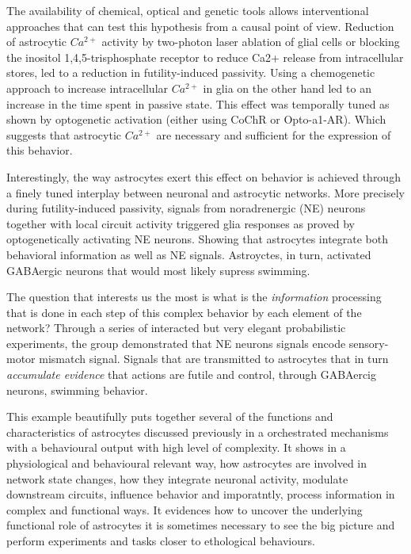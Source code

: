 The availability of chemical, optical and genetic tools allows interventional approaches that can test this hypothesis from a causal point of view. 
Reduction of astrocytic $Ca^{2+}$ activity by two-photon laser ablation of glial cells or blocking the inositol 1,4,5-trisphosphate receptor to reduce Ca2+ release from intracellular stores, led to a reduction in  futility-induced passivity. 
Using a chemogenetic approach to increase intracellular $Ca^{2+}$ in glia on the other hand led to an increase in the time spent in passive state. 
This effect was temporally tuned as shown by optogenetic activation (either using CoChR or Opto-a1-AR). 
Which suggests that astrocytic $Ca^{2+}$ are necessary and sufficient for the expression of this behavior. 

Interestingly, the way astrocytes exert this effect on behavior is achieved through a finely tuned interplay between neuronal and astrocytic networks. 
More precisely during futility-induced passivity, signals from noradrenergic (NE) neurons together with local circuit activity triggered glia responses as proved by optogenetically activating NE neurons. 
Showing that astrocytes integrate both behavioral information as well as NE signals.
Astroyctes, in turn, activated GABAergic neurons that would most likely supress swimming. 

The question that interests us the most is what is the \textit{information} processing that is done in each step of this complex behavior by each element of the network? 
Through a series of interacted but very elegant probabilistic experiments, the group demonstrated that NE neurons signals encode sensory-motor mismatch signal.
Signals that are transmitted to astrocytes that in turn \textit{accumulate evidence} that actions are futile and control, through GABAercig neurons, swimming behavior. 

This example beautifully puts together several of the functions and characteristics of astrocytes discussed previously in a orchestrated mechanisms with a behavioural output with high level of complexity. 
It shows in a physiological and behavioural relevant way, how astrocytes are involved in network state changes, how they integrate neuronal activity, modulate downstream circuits, influence behavior and imporatntly, process information in complex and functional ways.  
It evidences how to uncover the underlying functional role of astrocytes it is sometimes necessary to see the big picture and perform experiments and tasks closer to ethological behaviours.  

